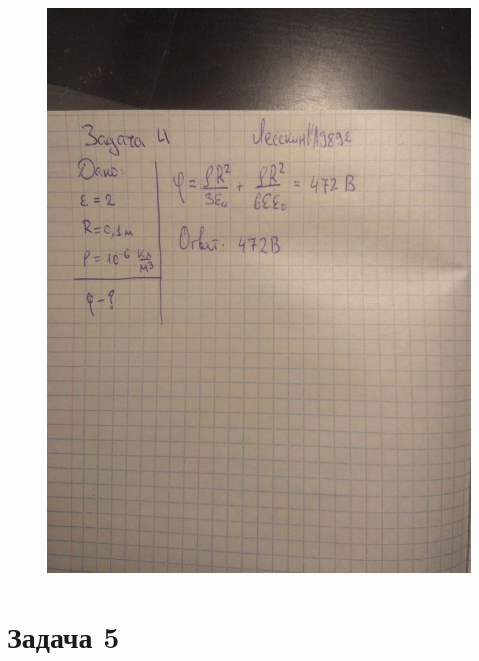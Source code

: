 \documentclass[12pt,a4paper]{article}  %
\begin{document}
	\begin{figure}[hpt!]
		\centering
		\includegraphics[width=1\linewidth]{photo/task4_solution}
	\end{figure}
	
	\section*{Задача 5}
	
\end{document}
